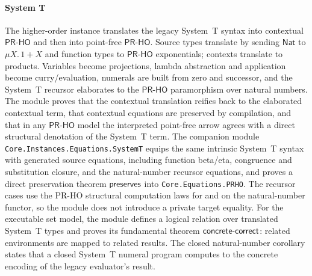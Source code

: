 \documentclass[sigplan,10pt,anonymous,review,screen]{acmart}
\newcommand{\PRHO}{\ensuremath{\mathsf{PR\mbox{-}HO}}}
\newcommand{\AgdaFile}[1]{\texttt{#1}}
\begin{document}
\paragraph{System T}
The higher-order instance translates the legacy System~T syntax into
contextual \PRHO{} and then into point-free \PRHO{}.  Source types
translate by sending \(\mathsf{Nat}\) to \(\mu X.\,1+X\) and function
types to \PRHO{} exponentials; contexts translate to products.  Variables
become projections, lambda abstraction and application become
curry/evaluation, numerals are built from zero and successor, and the
System~T recursor elaborates to the \PRHO{} paramorphism over natural
numbers.  The module proves that the contextual translation reifies back
to the elaborated contextual term, that contextual equations are
preserved by compilation, and that in any \PRHO{} model the interpreted
point-free arrow agrees with a direct structural denotation of the
System~T term.  The companion module
\AgdaFile{Core.Instances.Equations.SystemT} equips the same intrinsic
System~T syntax with generated source equations, including function
beta/eta, congruence and substitution closure, and the natural-number
recursor equations, and proves a direct preservation theorem
\(\AgdaFunction{preserves}\) into
\AgdaFile{Core.Equations.PRHO}.  The recursor cases use the PR-HO
structural computation laws for  and
 on the natural-number functor, so the
module does not introduce a private target equality.  For the executable set model, the module defines a
logical relation over translated System~T types and proves its
fundamental theorem \(\AgdaFunction{concrete-correct}\): related
environments are mapped to related results.  The closed natural-number
corollary  states that a closed System~T
numeral program computes to the concrete encoding of the legacy
evaluator's result.
\end{document}
